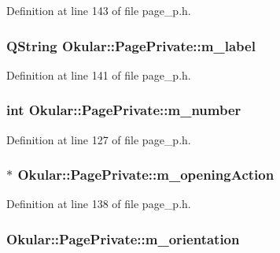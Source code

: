 Definition at line 143 of file page\+\_\+p.\+h.

\hypertarget{classOkular_1_1PagePrivate_adbe1a6d7fd7b290f9db98aac52b0f205}{
\subsubsection[{m\+\_\+label}]{\setlength{\rightskip}{0pt plus 5cm}Q\+String Okular\+::\+Page\+Private\+::m\+\_\+label}}\label{classOkular_1_1PagePrivate_adbe1a6d7fd7b290f9db98aac52b0f205}


Definition at line 141 of file page\+\_\+p.\+h.

\hypertarget{classOkular_1_1PagePrivate_a449baffebfd4db332b181cb2e644ab5e}{
\subsubsection[{m\+\_\+number}]{\setlength{\rightskip}{0pt plus 5cm}int Okular\+::\+Page\+Private\+::m\+\_\+number}}\label{classOkular_1_1PagePrivate_a449baffebfd4db332b181cb2e644ab5e}


Definition at line 127 of file page\+\_\+p.\+h.

\hypertarget{classOkular_1_1PagePrivate_a403a6221308ea39b4bac82be56f43711}{
\subsubsection[{m\+\_\+opening\+Action}]{$\ast$ Okular\+::\+Page\+Private\+::m\+\_\+opening\+Action}}\label{classOkular_1_1PagePrivate_a403a6221308ea39b4bac82be56f43711}


Definition at line 138 of file page\+\_\+p.\+h.

\hypertarget{classOkular_1_1PagePrivate_a942827926c5eaa9ca5a022aa48187e1d}{
\subsubsection[{m\+\_\+orientation}]{ Okular\+::\+Page\+Private\+::m\+\_\+orientation}}\label{classOkular_1_1PagePrivate_a942827926c5eaa9ca5a022aa48187e1d}


